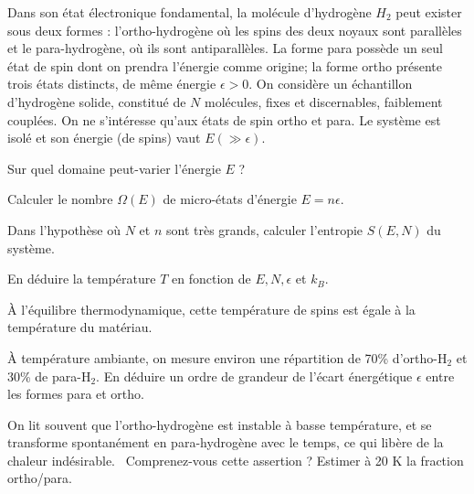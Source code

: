 \documentclass[utf8, 11pt]{feuille}
\begin{document}
Dans son état électronique fondamental, la molécule d'hydrogène $H_2$ peut exister sous deux formes : l'ortho-hydrogène où les spins des deux noyaux sont parallèles et le para-hydrogène, où ils sont antiparallèles. La forme para possède un seul état de spin dont on prendra l'énergie comme origine; la forme ortho présente trois états distincts, de même énergie $\epsilon >0$. On considère un échantillon d'hydrogène solide, constitué de $N$ molécules, fixes et discernables, faiblement couplées. On ne s'intéresse qu'aux états de spin ortho et para. Le système est isolé et son énergie (de spins) vaut $E (\gg \epsilon)$.

\question
Sur quel domaine peut-varier l'énergie $E$ ?

\question
Calculer le nombre $\Omega(E)$ de micro-états d'énergie $E = n \epsilon$.

\question
Dans l'hypothèse où $N$ et $n$ sont très grands, calculer l'entropie $S(E,N)$ du système.

\question
En déduire la température $T$ en fonction de $E, N, \epsilon$ et $k_B$.

\medskip

\`A l'équilibre thermodynamique, cette température de spins est égale à la température du matériau.

\question
\`A température ambiante, on mesure environ une répartition de 70\% d'ortho-H$_2$ et 30\% de para-H$_2$. En déduire un ordre de grandeur de l'écart énergétique $\epsilon$ entre les formes para et ortho.

\question
On lit souvent que \og l'ortho-hydrogène est instable à basse température, et se transforme spontanément en para-hydrogène avec le temps, ce qui libère de la chaleur indésirable. \fg \ Comprenez-vous cette assertion ? Estimer à 20 K la fraction ortho/para.
\end{document}
